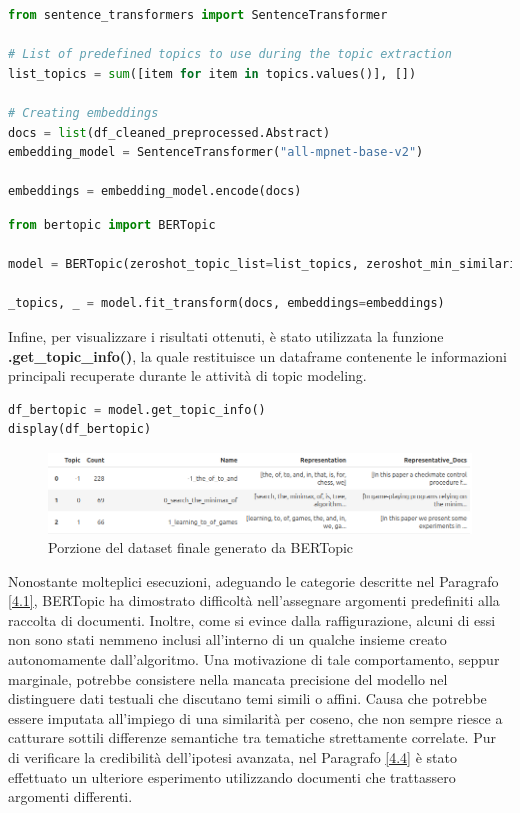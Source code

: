 \begin{lstlisting}[language=python, caption=Definizione della lista di topic e 
degli embeddings]
from sentence_transformers import SentenceTransformer

# List of predefined topics to use during the topic extraction
list_topics = sum([item for item in topics.values()], [])

# Creating embeddings
docs = list(df_cleaned_preprocessed.Abstract)
embedding_model = SentenceTransformer("all-mpnet-base-v2")

embeddings = embedding_model.encode(docs)
\end{lstlisting}
\begin{lstlisting}[language=python, caption=Creazione e fitting del modello BERTopic]
from bertopic import BERTopic

model = BERTopic(zeroshot_topic_list=list_topics, zeroshot_min_similarity=.6)

_topics, _ = model.fit_transform(docs, embeddings=embeddings)
\end{lstlisting}
Infine, per visualizzare i risultati ottenuti, è stato utilizzata la funzione \textbf{.get\_topic\_info()}, la quale restituisce un dataframe contenente le informazioni principali recuperate durante le attività di topic modeling.
\begin{lstlisting}[language=python, caption=Recupero e visualizzazione del dataset finale generato da BERTopic]
df_bertopic = model.get_topic_info()
display(df_bertopic)
\end{lstlisting}
\begin{figure}[H]
    \centering
    \includegraphics[width=1.0\textwidth]{img/img7.png}
    \caption{Porzione del dataset finale generato da BERTopic}
\end{figure}
Nonostante molteplici esecuzioni, adeguando le categorie descritte nel Paragrafo \ref{4.1}, BERTopic ha dimostrato difficoltà nell'assegnare argomenti predefiniti alla raccolta di documenti. Inoltre, come si evince dalla raffigurazione, alcuni di essi non sono stati nemmeno inclusi all'interno di un qualche insieme creato autonomamente dall'algoritmo. Una motivazione di tale comportamento, seppur marginale, potrebbe consistere nella mancata precisione del modello nel distinguere dati testuali che discutano temi simili o affini. Causa che potrebbe essere imputata all'impiego di una similarità per coseno, che non sempre riesce a catturare sottili differenze semantiche tra tematiche strettamente correlate. Pur di verificare la credibilità dell'ipotesi avanzata, nel Paragrafo \ref{4.4} è stato effettuato un ulteriore esperimento utilizzando documenti che trattassero argomenti differenti. \vspace{7pt} \\
